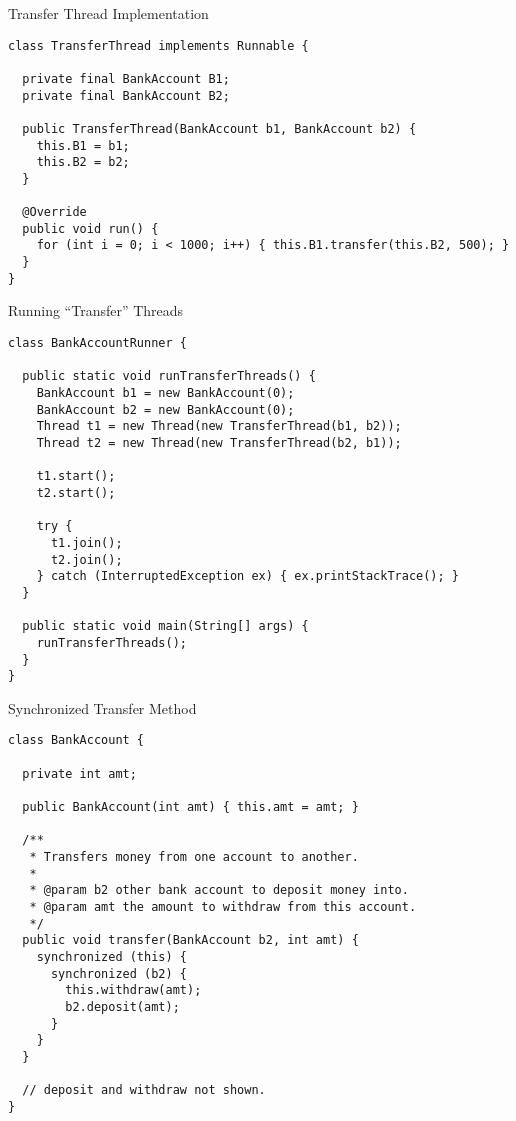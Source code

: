 \begin{cl}{Transfer Thread Implementation}
\begin{lstlisting}[language=MyJava]
class TransferThread implements Runnable {

  private final BankAccount B1;
  private final BankAccount B2;

  public TransferThread(BankAccount b1, BankAccount b2) {
    this.B1 = b1;
    this.B2 = b2;
  }

  @Override
  public void run() {
    for (int i = 0; i < 1000; i++) { this.B1.transfer(this.B2, 500); }
  }
}
\end{lstlisting}
\end{cl}

\begin{cl}{Running ``Transfer'' Threads}
\begin{lstlisting}[language=MyJava]
class BankAccountRunner {

  public static void runTransferThreads() {
    BankAccount b1 = new BankAccount(0);
    BankAccount b2 = new BankAccount(0);
    Thread t1 = new Thread(new TransferThread(b1, b2));
    Thread t2 = new Thread(new TransferThread(b2, b1));

    t1.start();
    t2.start();

    try {
      t1.join();
      t2.join();
    } catch (InterruptedException ex) { ex.printStackTrace(); }
  }

  public static void main(String[] args) {
    runTransferThreads();
  }
}
\end{lstlisting}
\end{cl}

\begin{cl}{Synchronized Transfer Method}
\begin{lstlisting}[language=MyJava]
class BankAccount {

  private int amt;

  public BankAccount(int amt) { this.amt = amt; }

  /**
   * Transfers money from one account to another.
   *
   * @param b2 other bank account to deposit money into.
   * @param amt the amount to withdraw from this account.
   */
  public void transfer(BankAccount b2, int amt) {
    synchronized (this) {
      synchronized (b2) {
        this.withdraw(amt);
        b2.deposit(amt);
      }
    }
  }

  // deposit and withdraw not shown.
}
\end{lstlisting}
\end{cl}

